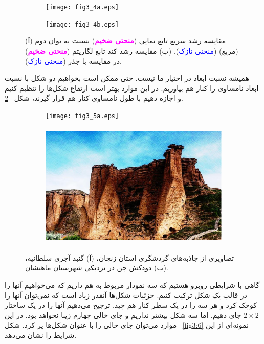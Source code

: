 \begin{figure}[!tbhp] %
	\begin{subfigure}[b]{0.35\linewidth}
	\texttt{[image: fig3\_4a.eps]}
	\caption{}
	\end{subfigure}\qquad
	\begin{subfigure}[b]{0.35\linewidth}
	\texttt{[image: fig3\_4b.eps]}
	\caption{}
	\end{subfigure}
\caption[ %
مقایسه رشد سریع تابع نمایی با مربع و رشد کند لگاریتم با جذر]{ %
(آ) مقایسه رشد سریع تابع نمایی 
(\textbf{\textcolor{magenta}{منحتی ضخیم}}) 
نسبت به توان دوم (مربع) 
(\textcolor{blue}{منحنی نازک}).
(ب) مقایسه رشد کند تابع لگاریتم 
(\textbf{\textcolor{magenta}{منحتی ضخیم}}) 
در مقایسه با جذر 
(\textcolor{blue}{منحنی نازک}).}
\label{fig3:4}
\end{figure}

همیشه نسبت ابعاد در اختیار ما نیست. حتی ممکن است بخواهیم دو شکل با نسبت ابعاد نامساوی را کنار هم بیاوریم. در این موارد بهتر است ارتفاع شکل‌ها را تنظیم کنیم و اجازه دهیم با طول نامساوی کنار هم قرار گیرند، شکل~%
\ref{fig3:5}.


\begin{figure}[!tbhp] %
	\begin{subfigure}[b]{0.25\linewidth}
	\texttt{[image: fig3\_5a.eps]}
	\caption{}
	\end{subfigure}\qquad
	\begin{subfigure}[b]{0.55\linewidth}
	\includegraphics[height=6cm]{fig3_5b.eps}
	\caption{}
	\end{subfigure}
\caption[ %
تصاویری از جاذبه‌های گردشگری زنجان]{ %
تصاویری از جاذبه‌های گردشگری استان زنجان، (آ) گنبد آجری سلطانیه، (ب) دودکش جن در نزدیکی شهرستان ماهنشان.}
\label{fig3:5}
\end{figure}

گاهی با شرایطی روبرو هستیم که سه نمودار مربوط به هم داریم که می‌خواهیم آنها را در قالب یک شکل ترکیب کنیم. جزئیات شکل‌ها آنقدر زیاد است که نمی‌توان آنها را کوچک کرد و هر سه را در یک سطر کنار هم چید. ترجیح می‌دهیم آنها را در یک ساختار 
$2\times2$ 
جای دهیم. اما سه شکل بیشتر نداریم و جای خالی چهارم زیبا نخواهد بود. در این موارد می‌توان جای خالی را با عنوان شکل‌ها پر کرد. شکل~%
\ref{fig3:6} 
نمونه‌ای از این شرایط را نشان می‌دهد.

